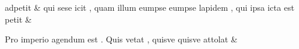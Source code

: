 \documentclass[12pt,onecolumn,twoside,a4paper]{memoir}
\begin{document}
\begin{pairs}
\begin{Leftside}
                              adpetit & 
                     qui
                              sese
                              icit
                              ,
                              quam
                              illum
                              eumpse
                              {eumpse}
                              lapidem
                              ,
                              qui
                              ipsa
                              icta
                              est
                              petit \&
                         \stanza {}
                     
                              Pro
                              imperio
                              agendum
                              est
                              .
                              Quis
                              vetat
                              ,
                              quisve
                              {quisve}
                              attolat \&
                     
                  \endnumbering
		\end{Leftside}
                  \begin{Rightside}
			\beginnumbering
			\numberstanzafalse
                     

\end{Rightside}
\end{pairs}
\end{document}
